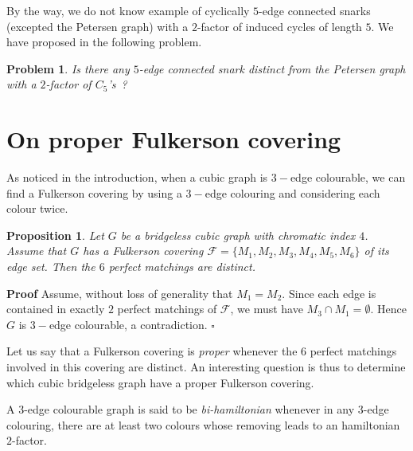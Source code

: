 \documentclass{amsart}
\newtheorem{prop}[thm]{Proposition}
\newtheorem{prob}[thm]{Problem}
\theoremstyle{definition}
\theoremstyle{remark}
\newenvironment{prf}{{\bf \noindent Proof } }{\hfill$\square$\\}
\begin{document}
By the way, we do not know example of cyclically $5$-edge connected
snarks (excepted the Petersen graph)  with a $2$-factor of induced
cycles of length $5$. We have proposed in \cite{FouVan09a} the
following problem.

\begin{prob} Is there any $5$-edge connected snark distinct from the Petersen
graph
with a $2$-factor of $C_5$'s~?
\end{prob}





\section{On proper Fulkerson covering\label{Section:FulkersonProperCovering}}


As noticed in the introduction, when a cubic graph is $3-$edge
colourable, we can find a Fulkerson covering by using a $3-$edge
colouring and considering each colour twice.
\begin{prop} \label{Proposition:ProperIndex4}
Let $G$ be a bridgeless cubic graph with chromatic index $4$. Assume
that $G$ has a Fulkerson covering $\mathcal F =\{M_{1},
M_{2},M_{3},M_{4},M_{5},M_{6}\}$ of its edge set. Then the $6$
perfect matchings are distinct.
\end{prop}
\begin{prf}Assume, without loss of generality that $M_{1}=M_{2}$.
Since each edge is contained in exactly $2$ perfect matchings of
$\mathcal F$, we must have $M_{3} \cap M_{1}= \emptyset$. Hence $G$
is $3-$edge colourable, a contradiction.
\end{prf}

Let us say that a Fulkerson covering is {\em proper} whenever the
$6$ perfect matchings involved in this covering are distinct. An
interesting question is thus to determine which cubic bridgeless
graph have a proper Fulkerson covering.

A $3$-edge colourable graph is said to be {\em bi-hamiltonian} whenever in any
$3$-edge colouring, there are at least two colours whose removing leads to an
hamiltonian $2$-factor.
\end{document}
